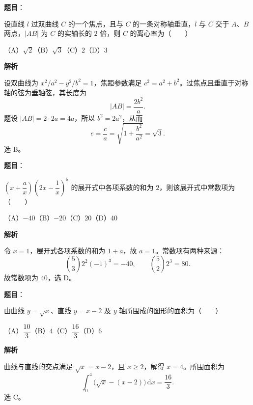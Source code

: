 \begin{answer}

\textbf{题目}：

设直线 $l$ 过双曲线 $C$ 的一个焦点，且与 $C$ 的一条对称轴垂直，$l$ 与 $C$ 交于 $A\text{、}B$ 两点，$|AB|$ 为 $C$ 的实轴长的 $2$ 倍，则 $C$ 的离心率为\mbox{（　　）}

（A）$\sqrt2$\quad（B）$\sqrt3$\quad（C）$2$\quad（D）$3$

\textbf{解析}

设双曲线为 $x^2/a^2-y^2/b^2=1$，焦距参数满足 $c^2=a^2+b^2$。过焦点且垂直于对称轴的弦为垂轴弦，其长度为
\nopagebreak[4]
\[
|AB|=\frac{2b^2}{a}.
\]
题设 $|AB|=2\cdot2a=4a$，所以 $b^2=2a^2$，从而
\nopagebreak[4]
\[
e=\frac ca=\sqrt{1+\frac{b^2}{a^2}}=\sqrt3.
\]
选 B。


\end{answer}
\begin{answer}

\textbf{题目}：

$(x+\dfrac ax)(2x-\dfrac1x)^5$ 的展开式中各项系数的和为 $2$，则该展开式中常数项为\mbox{（　　）}

（A）$-40$\quad（B）$-20$\quad（C）$20$\quad（D）$40$

\textbf{解析}

令 $x=1$，展开式各项系数的和为 $1+a$，故 $a=1$。常数项有两种来源：
\nopagebreak[4]
\[
\binom53 2^2(-1)^3=-40,
\qquad
\binom52 2^3=80.
\]
故常数项为 $40$，选 D。


\end{answer}
\begin{answer}

\textbf{题目}：

由曲线 $y=\sqrt{x}$、直线 $y=x-2$ 及 $y$ 轴所围成的图形的面积为\mbox{（　　）}

（A）$\dfrac{10}{3}$\quad（B）$4$\quad（C）$\dfrac{16}{3}$\quad（D）$6$

\textbf{解析}

曲线与直线的交点满足 $\sqrt{x}=x-2$，且 $x\geq2$，解得 $x=4$。所围面积为
\nopagebreak[4]
\[
\int_0^4\bigl(\sqrt{x}-(x-2)\bigr)\,\mathrm dx
=\frac{16}{3}.
\]
选 C。


\end{answer}
